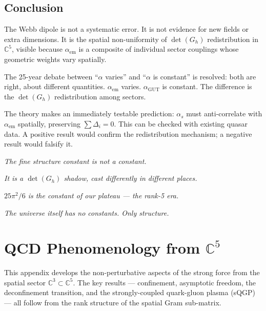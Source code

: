 \documentclass[12pt]{article}
\theoremstyle{remark}
\theoremstyle{definition}
\newcommand{\CC}{\mathbb{C}}
\newcommand{\agut}{\alpha_{\mathrm{GUT}}}
\begin{document}
\subsection{Conclusion}

The Webb dipole is not a systematic error. It is not evidence for new fields or extra dimensions. It is the spatial non-uniformity of $\det(G_h)$ redistribution in $\CC^5$, visible because $\alpha_\text{em}$ is a composite of individual sector couplings whose geometric weights vary spatially.

The 25-year debate between ``$\alpha$ varies'' and ``$\alpha$ is constant'' is resolved: both are right, about different quantities. $\alpha_\text{em}$ varies. $\agut$ is constant. The difference is the $\det(G_h)$ redistribution among sectors.

The theory makes an immediately testable prediction: $\alpha_s$ must anti-correlate with $\alpha_\text{em}$ spatially, preserving $\sum\Delta_i = 0$. This can be checked with existing quasar data. A positive result would confirm the redistribution mechanism; a negative result would falsify it.

\begin{center}
\emph{The fine structure constant is not a constant.}

\emph{It is a $\det(G_h)$ shadow, cast differently in different places.}

\emph{$25\pi^2/6$ is the constant of our plateau --- the rank-5 era.}

\emph{The universe itself has no constants. Only structure.}
\end{center}

\section{QCD Phenomenology from $\CC^5$}
\label{app:qcd}

This appendix develops the non-perturbative aspects of the strong force from the spatial sector $\CC^3 \subset \CC^5$. The key results --- confinement, asymptotic freedom, the deconfinement transition, and the strongly-coupled quark-gluon plasma (sQGP) --- all follow from the rank structure of the spatial Gram sub-matrix.
\end{document}
